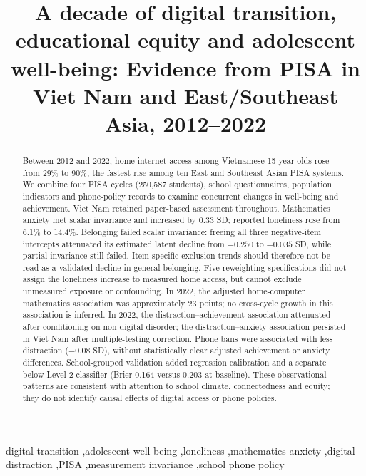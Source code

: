 \documentclass[preprint,12pt,authoryear,nonatbib]{elsarticle}
\newif\ifblindreview
\begin{document}
\begin{frontmatter}
\title{A decade of digital transition, educational equity and adolescent well-being: Evidence from PISA in Viet Nam and East/Southeast Asia, 2012--2022}

\ifblindreview
\author{Anonymous manuscript for peer review}
\else

\fi

\begin{abstract}
Between 2012 and 2022, home internet access among Vietnamese 15-year-olds rose from 29\% to 90\%, the fastest rise among ten East and Southeast Asian PISA systems. We combine four PISA cycles (250,587 students), school questionnaires, population indicators and phone-policy records to examine concurrent changes in well-being and achievement. Viet Nam retained paper-based assessment throughout. Mathematics anxiety met scalar invariance and increased by 0.33 SD; reported loneliness rose from 6.1\% to 14.4\%. Belonging failed scalar invariance: freeing all three negative-item intercepts attenuated its estimated latent decline from $-0.250$ to $-0.035$ SD, while partial invariance still failed. Item-specific exclusion trends should therefore not be read as a validated decline in general belonging. Five reweighting specifications did not assign the loneliness increase to measured home access, but cannot exclude unmeasured exposure or confounding. In 2022, the adjusted home-computer mathematics association was approximately 23 points; no cross-cycle growth in this association is inferred. In 2022, the distraction--achievement association attenuated after conditioning on non-digital disorder; the distraction--anxiety association persisted in Viet Nam after multiple-testing correction. Phone bans were associated with less distraction ($-0.08$ SD), without statistically clear adjusted achievement or anxiety differences. School-grouped validation added regression calibration and a separate below-Level-2 classifier (Brier 0.164 versus 0.203 at baseline). These observational patterns are consistent with attention to school climate, connectedness and equity; they do not identify causal effects of digital access or phone policies.
\end{abstract}

\begin{keyword}
digital transition \sep adolescent well-being \sep loneliness \sep mathematics anxiety \sep digital distraction \sep PISA \sep measurement invariance \sep school phone policy
\end{keyword}
\end{frontmatter}
\end{document}
